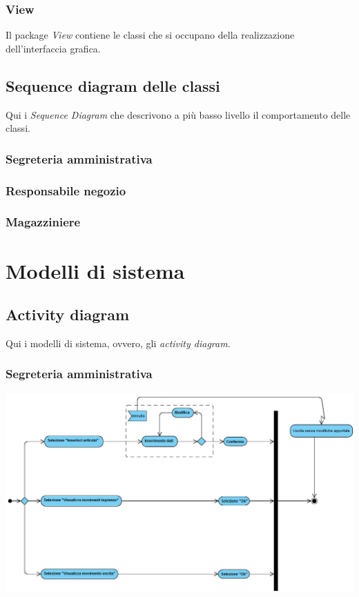 \documentclass[a4paper]{article}
\begin{document}
\newpage

\subsubsection{View}
Il package \textit{View} contiene le classi che si occupano della realizzazione dell'interfaccia grafica.

\newpage

\subsection{Sequence diagram delle classi}
Qui i \textit{Sequence Diagram} che descrivono a pi\`u basso livello il comportamento delle classi.
\subsubsection{Segreteria amministrativa}
\subsubsection{Responsabile negozio}

\subsubsection{Magazziniere}
 
\newpage

\section{Modelli di sistema}
\subsection{Activity diagram}
Qui i modelli di sistema, ovvero, gli \textit{activity diagram}.

\subsubsection{Segreteria amministrativa}  
\begin{center}
	
	\begin{changemargin}{-1.5cm}{-0.5cm} 
		\includegraphics [scale=0.5] {ActivityDiagram_SegreteriaAmministrativa}
	\end{changemargin} 
	
	
\end{center}
\end{document}
